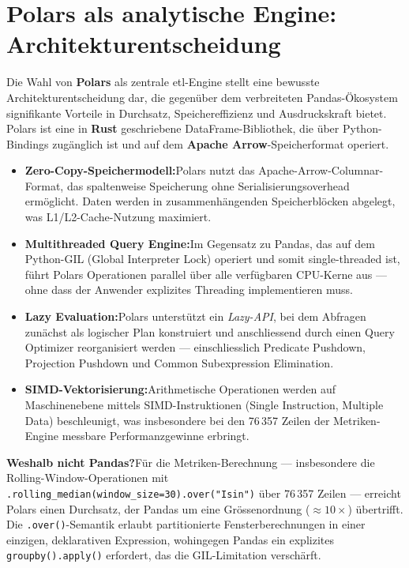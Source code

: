 \documentclass[11pt, a4paper, oneside, openany]{report}
\newcommand{\code}[1]{\texttt{\small\textcolor{DeepNavy}{#1}}}
\begin{document}
\section{Polars als analytische Engine: Architekturentscheidung}
\label{sec:polars}

Die Wahl von \textbf{Polars} als zentrale \gls{etl}-Engine stellt eine bewusste Architekturentscheidung dar, die gegenüber dem verbreiteten Pandas-Ökosystem signifikante Vorteile in Durchsatz, Speichereffizienz und Ausdruckskraft bietet. Polars ist eine in \textbf{Rust} geschriebene DataFrame-Bibliothek, die über Python-Bindings zugänglich ist und auf dem \textbf{Apache Arrow}-Speicherformat operiert.

\begin{infobox}
\begin{itemize}
  \item \textbf{Zero-Copy-Speichermodell:}\;Polars nutzt das Apache-Arrow-Columnar-Format, das spaltenweise Speicherung ohne Serialisierungsoverhead ermöglicht. Daten werden in zusammenhängenden Speicherblöcken abgelegt, was L1/L2-Cache-Nutzung maximiert.
  \item \textbf{Multithreaded Query Engine:}\;Im Gegensatz zu Pandas, das auf dem Python-GIL (Global Interpreter Lock) operiert und somit single-threaded ist, führt Polars Operationen parallel über alle verfügbaren CPU-Kerne aus --- ohne dass der Anwender explizites Threading implementieren muss.
  \item \textbf{Lazy Evaluation:}\;Polars unterstützt ein \textit{Lazy-API}, bei dem Abfragen zunächst als logischer Plan konstruiert und anschliessend durch einen Query Optimizer reorganisiert werden --- einschliesslich Predicate Pushdown, Projection Pushdown und Common Subexpression Elimination.
  \item \textbf{SIMD-Vektorisierung:}\;Arithmetische Operationen werden auf Maschinenebene mittels SIMD-Instruktionen (Single Instruction, Multiple Data) beschleunigt, was insbesondere bei den 76\,357 Zeilen der Metriken-Engine messbare Performanzgewinne erbringt.
\end{itemize}
\end{infobox}

\textbf{Weshalb nicht Pandas?}\;Für die Metriken-Berechnung --- insbesondere die Rolling-Window-Operationen mit \code{.rolling\_median(window\_size=30).over("Isin")} über 76\,357 Zeilen --- erreicht Polars einen Durchsatz, der Pandas um eine Grössenordnung ($\approx 10\times$) übertrifft. Die \code{.over()}-Semantik erlaubt partitionierte Fensterberechnungen in einer einzigen, deklarativen Expression, wohingegen Pandas ein explizites \code{groupby().apply()} erfordert, das die GIL-Limitation verschärft.
\end{document}
